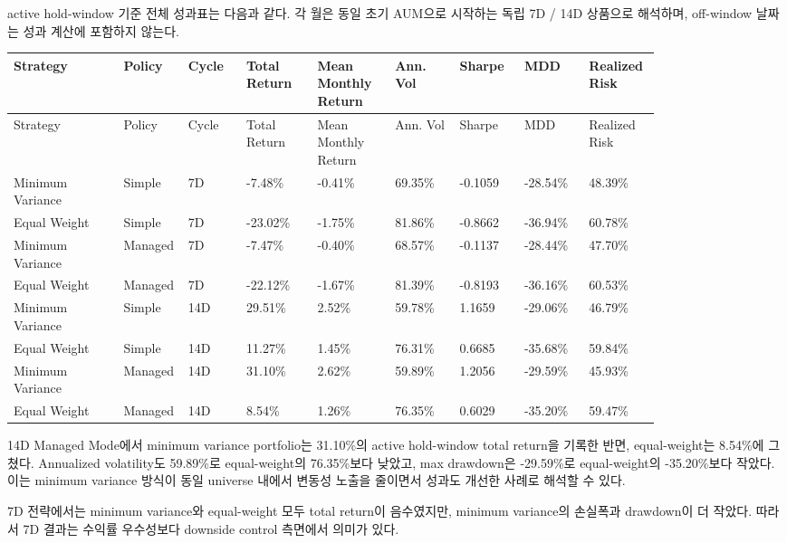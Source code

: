 \documentclass[12pt,a4paper]{article}
\begin{document}
active hold-window 기준 전체 성과표는 다음과 같다. 각 월은 동일 초기 AUM으로 시작하는 독립 7D / 14D 상품으로 해석하며, off-window 날짜는 성과 계산에 포함하지 않는다.

\begin{center}
\scriptsize
\begin{longtable}{@{}lp{0.10\linewidth}p{0.09\linewidth}p{0.11\linewidth}p{0.12\linewidth}p{0.10\linewidth}p{0.10\linewidth}p{0.10\linewidth}p{0.11\linewidth}@{}}
\toprule
Strategy & Policy & Cycle & Total Return & Mean Monthly Return & Ann. Vol & Sharpe & MDD & Realized Risk \\
\midrule
\endfirsthead
\toprule
Strategy & Policy & Cycle & Total Return & Mean Monthly Return & Ann. Vol & Sharpe & MDD & Realized Risk \\
\midrule
\endhead
Minimum Variance & Simple & 7D & -7.48\% & -0.41\% & 69.35\% & -0.1059 & -28.54\% & 48.39\% \\
Equal Weight & Simple & 7D & -23.02\% & -1.75\% & 81.86\% & -0.8662 & -36.94\% & 60.78\% \\
Minimum Variance & Managed & 7D & -7.47\% & -0.40\% & 68.57\% & -0.1137 & -28.44\% & 47.70\% \\
Equal Weight & Managed & 7D & -22.12\% & -1.67\% & 81.39\% & -0.8193 & -36.16\% & 60.53\% \\
Minimum Variance & Simple & 14D & 29.51\% & 2.52\% & 59.78\% & 1.1659 & -29.06\% & 46.79\% \\
Equal Weight & Simple & 14D & 11.27\% & 1.45\% & 76.31\% & 0.6685 & -35.68\% & 59.84\% \\
Minimum Variance & Managed & 14D & 31.10\% & 2.62\% & 59.89\% & 1.2056 & -29.59\% & 45.93\% \\
Equal Weight & Managed & 14D & 8.54\% & 1.26\% & 76.35\% & 0.6029 & -35.20\% & 59.47\% \\
\bottomrule
\end{longtable}
\end{center}

14D Managed Mode에서 minimum variance portfolio는 31.10\%의 active hold-window total return을 기록한 반면, equal-weight는 8.54\%에 그쳤다. Annualized volatility도 59.89\%로 equal-weight의 76.35\%보다 낮았고, max drawdown은 -29.59\%로 equal-weight의 -35.20\%보다 작았다. 이는 minimum variance 방식이 동일 universe 내에서 변동성 노출을 줄이면서 성과도 개선한 사례로 해석할 수 있다.

7D 전략에서는 minimum variance와 equal-weight 모두 total return이 음수였지만, minimum variance의 손실폭과 drawdown이 더 작았다. 따라서 7D 결과는 수익률 우수성보다 downside control 측면에서 의미가 있다.
\end{document}
